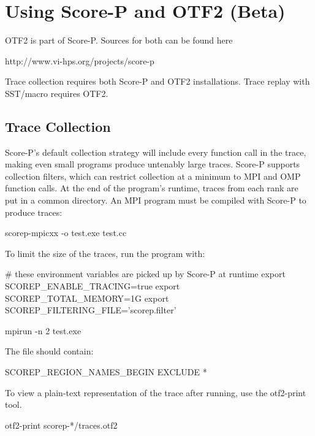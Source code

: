 
\section{Using Score-P and OTF2 (Beta)}
\label{sec:tutorial:otf}

OTF2 is part of Score-P. Sources for both can be found here 
\begin{ViFile}
http://www.vi-hps.org/projects/score-p
\end{ViFile}


Trace collection requires both Score-P and OTF2 installations. Trace replay with SST/macro requires OTF2.


\subsection{Trace Collection}
\label{subsec:otf:traceCollection}
Score-P's default collection strategy will include every function call in the trace, making even small programs produce untenably large traces. Score-P supports collection filters, which can restrict collection at a minimum to MPI and OMP function calls. At the end of the program's runtime, traces from each rank are put in a common directory.  An MPI program must be compiled with Score-P to produce traces:

\begin{ShellCmd}
scorep-mpicxx -o test.exe test.cc
\end{ShellCmd}



To limit the size of the traces, run the program with:

\begin{ViFile}
# these environment variables are picked up by Score-P at runtime
export SCOREP_ENABLE_TRACING=true
export SCOREP_TOTAL_MEMORY=1G
export SCOREP_FILTERING_FILE='scorep.filter'

mpirun -n 2 test.exe
\end{ViFile}

The file  should contain:
\begin{ViFile}
SCOREP_REGION_NAMES_BEGIN EXCLUDE *
\end{ViFile}


To view a plain-text representation of the trace after running, use the otf2-print tool.

\begin{ViFile}
otf2-print scorep-*/traces.otf2
\end{ViFile}

